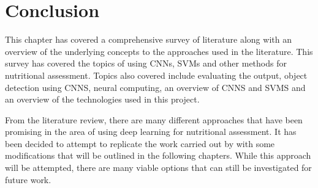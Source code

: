\section{Conclusion}
This chapter has covered a comprehensive survey of literature along with an overview of the underlying concepts to the approaches used in the literature.
This survey has covered the topics of using CNNs, SVMs and other methods for nutritional assessment.
Topics also covered include evaluating the output, object detection using CNNS, neural computing, an overview of CNNS and SVMS and an overview of the technologies used in this project.

From the literature review, there are many different approaches that have been promising in the area of using deep learning for nutritional assessment.
It has been decided to attempt to replicate the work carried out by \parencite{yanaiFood} with some modifications that will be outlined in the following chapters.
While this approach will be attempted, there are many viable options that can still be investigated for future work.


